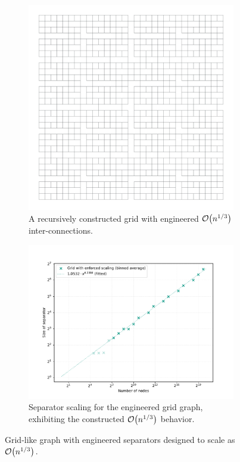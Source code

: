 \begin{figure}[tbhp]
	\centering
	\begin{subfigure}{0.35\linewidth}
		\centering
		\includegraphics[width=\linewidth]{graphics/cbrt_grid.png}
		\caption{A recursively constructed grid with engineered \(\mathcal{O}\!\left(n^{1/3}\right)\) inter-connections.}
		\label{fig:engineered_grid_structure_viz}
	\end{subfigure}
	\hfill
	\begin{subfigure}{0.55\linewidth}
		\centering
		\includegraphics[width=\linewidth]{graphics/cbrt_grid_sep_scaling.pdf}
		\caption{Separator scaling for the engineered grid graph, exhibiting the constructed \(\mathcal{O}\!\left(n^{1/3}\right)\) behavior.}
		\label{fig:engineered_grid_sep_plot}
	\end{subfigure}
	\caption{Grid-like graph with engineered separators designed to scale as \(\mathcal{O}\!\left(n^{1/3}\right)\).}
	\label{fig:engineered_grid_sep}
\end{figure}


